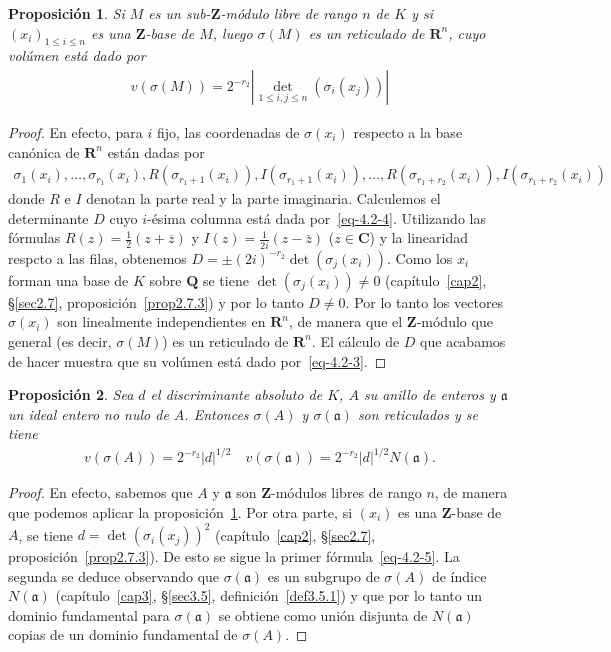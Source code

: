 \documentclass[oneside,bibtotoc,leqno,spanish]{amsbook}
\newcommand{\RR}{\mathbf{R}}
\newcommand{\QQ}{\mathbf{Q}}
\newcommand{\ZZ}{\mathbf{Z}}
\newcommand{\CC}{\mathbf{C}}
\newcommand{\idl}[1]{\mathfrak{#1}}
\newcommand{\oline}[1]{\overline{#1}}
\newcommand{\abs}[1]{\left\lvert#1\right\rvert}
\numberwithin{equation}{section}
\theoremstyle{defi}
\theoremstyle{note}
\newtheorem{proposition}{Proposici\'on}
\theoremstyle{rem}
\numberwithin{theorem}{section}
\numberwithin{proposition}{section}
\numberwithin{definition}{section}
\numberwithin{lemma}{section}
\numberwithin{corollary}{section}
\numberwithin{example}{section}
\numberwithin{footnote}{section}%
\begin{document}
\begin{proposition}\label{prop4.2.1}
Si $M$ es un sub-$\ZZ$-m\'odulo libre de rango $n$ de $K$ y si $(x_{i})_{1\leq i\leq n}$ es una $\ZZ$-base
de $M$, luego $\sigma(M)$ es un reticulado de $\RR^{n}$, cuyo vol\'umen est\'a dado por
\begin{gather}\label{eq-4.2-3}
v(\sigma(M)) = 2^{-r_{2}}\abs{\det_{1\leq i,j\leq n}(\sigma_{i}(x_{j}))}
\end{gather}
\end{proposition}

\begin{proof}
En efecto, para $i$ fijo, las coordenadas de $\sigma(x_{i})$ respecto a la base can\'onica de $\RR^{n}$ est\'an
dadas por
\begin{gather}\label{eq-4.2-4}
\sigma_{1}(x_{i}),\dots,\sigma_{r_{1}}(x_{i}),R(\sigma_{r_{1}+1}(x_{i})),I(\sigma_{r_{1}+1}(x_{i})),\dots,
R(\sigma_{r_{1}+r_{2}}(x_{i})),I(\sigma_{r_{1}+r_{2}}(x_{i}))
\end{gather}
donde $R$ e $I$ denotan la parte real y la parte imaginaria. Calculemos el determinante $D$ cuyo $i$-\'esima
columna est\'a dada por~\eqref{eq-4.2-4}. Utilizando las f\'ormulas $R(z) = \frac{1}{2}(z+\oline z)$ y
$I(z) = \frac{1}{2i}(z-\oline z)$ ($z\in\CC$) y la linearidad respcto a las filas, obtenemos $D = \pm (2i)^{-r_{2}}
\det(\sigma_{j}(x_{i}))$. Como los $x_{i}$ forman una base de $K$ sobre $\QQ$ se tiene $\det(\sigma_{j}(x_{i}))\neq 0$
(cap\'itulo~\ref{cap2}, \S\ref{sec2.7}, proposici\'on~\ref{prop2.7.3})
y por lo tanto $D\neq 0$. Por lo tanto los vectores $\sigma(x_{i})$ son linealmente
independientes en $\RR^{n}$, de manera que el $\ZZ$-m\'odulo que general (es decir, $\sigma(M)$) es un
reticulado de $\RR^{n}$. El c\'alculo de $D$ que acabamos de hacer muestra que su vol\'umen est\'a dado
por~\eqref{eq-4.2-3}.
\end{proof}

\begin{proposition}\label{prop4.2.2}
Sea $d$ el discriminante absoluto de $K$, $A$ su anillo de enteros y $\idl{a}$ un ideal entero no nulo de $A$.
Entonces $\sigma(A)$ y $\sigma(\idl{a})$ son reticulados y se tiene
\begin{gather}\label{eq-4.2-5}
v(\sigma(A)) = 2^{-r_{2}}\abs{d}^{1/2}\quad v(\sigma(\idl{a})) = 2^{-r_{2}}\abs{d}^{1/2}N(\idl{a}).
\end{gather}
\end{proposition}

\begin{proof}
En efecto, sabemos que $A$ y $\idl{a}$ son $\ZZ$-m\'odulos libres de rango $n$, de manera que podemos aplicar
la proposici\'on~\ref{prop4.2.1}.
Por otra parte, si $(x_{i})$ es una $\ZZ$-base de $A$, se tiene
$d = \det(\sigma_{i}(x_{j}))^{2}$
(cap\'itulo~\ref{cap2}, \S\ref{sec2.7}, proposici\'on~\ref{prop2.7.3}).
De esto se sigue la primer f\'ormula~\eqref{eq-4.2-5}. La segunda se deduce observando que
$\sigma(\idl{a})$ es un subgrupo de $\sigma(A)$ de \'indice $N(\idl{a})$
(cap\'itulo~\ref{cap3}, \S\ref{sec3.5}, definici\'on~\ref{def3.5.1}) y que por
lo tanto un dominio fundamental para $\sigma(\idl{a})$ se obtiene como uni\'on disjunta de $N(\idl{a})$ copias
de un dominio fundamental de $\sigma(A)$.
\end{proof}
\end{document}
